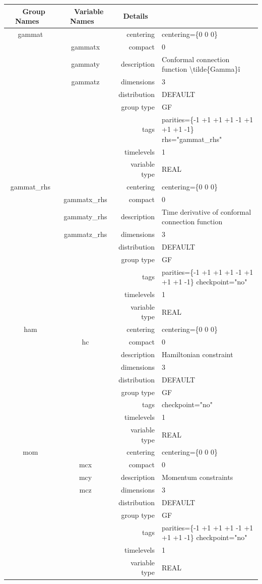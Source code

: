 \begin{tabular*}{150mm}{|c|c@{\extracolsep{\fill}}|rl|} \hline 
~ {\bf Group Names} ~ & ~ {\bf Variable Names} ~  &{\bf Details} ~ & ~ \\ 
\hline 
gammat &  & centering & centering=\{0 0 0\} \\ 
 & gammatx & compact & 0 \\ 
 & gammaty & description & Conformal connection function {\textbackslash}tilde\{Gamma\}\^i \\ 
 & gammatz & dimensions & 3 \\ 
 &  & distribution & DEFAULT \\ 
 &  & group type & GF \\ 
 &  & tags & parities=\{-1 +1 +1  +1 -1 +1  +1 +1 -1\}  rhs="gammat\_rhs" \\ 
 &  & timelevels & 1 \\ 
 &  & variable type & REAL \\ 
\hline 
gammat\_rhs &  & centering & centering=\{0 0 0\} \\ 
 & gammatx\_rhs & compact & 0 \\ 
 & gammaty\_rhs & description & Time derivative of conformal connection function \\ 
 & gammatz\_rhs & dimensions & 3 \\ 
 &  & distribution & DEFAULT \\ 
 &  & group type & GF \\ 
 &  & tags & parities=\{-1 +1 +1  +1 -1 +1  +1 +1 -1\}  checkpoint="no" \\ 
 &  & timelevels & 1 \\ 
 &  & variable type & REAL \\ 
\hline 
ham &  & centering & centering=\{0 0 0\} \\ 
 & hc & compact & 0 \\ 
 &  & description & Hamiltonian constraint \\ 
 &  & dimensions & 3 \\ 
 &  & distribution & DEFAULT \\ 
 &  & group type & GF \\ 
 &  & tags & checkpoint="no" \\ 
 &  & timelevels & 1 \\ 
 &  & variable type & REAL \\ 
\hline 
mom &  & centering & centering=\{0 0 0\} \\ 
 & mcx & compact & 0 \\ 
 & mcy & description & Momentum constraints \\ 
 & mcz & dimensions & 3 \\ 
 &  & distribution & DEFAULT \\ 
 &  & group type & GF \\ 
 &  & tags & parities=\{-1 +1 +1  +1 -1 +1  +1 +1 -1\} checkpoint="no" \\ 
 &  & timelevels & 1 \\ 
 &  & variable type & REAL \\ 
\hline 
\end{tabular*} 



